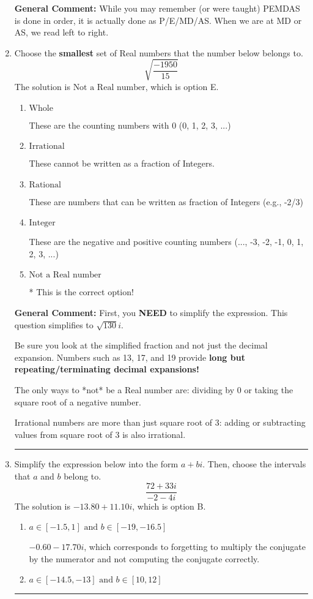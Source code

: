 \documentclass{extbook}[14pt]
\newcommand{\litem}[1]{\item #1

\rule{\textwidth}{0.4pt}}
\begin{document}
\begin{enumerate}
{\textbf{General Comment:} While you may remember (or were taught) PEMDAS is done in order, it is actually done as P/E/MD/AS. When we are at MD or AS, we read left to right.
}
\litem{
Choose the \textbf{smallest} set of Real numbers that the number below belongs to.
\[ \sqrt{\frac{-1950}{15}} \]The solution is \( \text{Not a Real number} \), which is option E.\begin{enumerate}[label=\Alph*.]
\item \( \text{Whole} \)

These are the counting numbers with 0 (0, 1, 2, 3, ...)
\item \( \text{Irrational} \)

These cannot be written as a fraction of Integers.
\item \( \text{Rational} \)

These are numbers that can be written as fraction of Integers (e.g., -2/3)
\item \( \text{Integer} \)

These are the negative and positive counting numbers (..., -3, -2, -1, 0, 1, 2, 3, ...)
\item \( \text{Not a Real number} \)

* This is the correct option!
\end{enumerate}

\textbf{General Comment:} First, you \textbf{NEED} to simplify the expression. This question simplifies to $\sqrt{130} i$. 
 
 Be sure you look at the simplified fraction and not just the decimal expansion. Numbers such as 13, 17, and 19 provide \textbf{long but repeating/terminating decimal expansions!} 
 
 The only ways to *not* be a Real number are: dividing by 0 or taking the square root of a negative number. 
 
 Irrational numbers are more than just square root of 3: adding or subtracting values from square root of 3 is also irrational.
}
\litem{
Simplify the expression below into the form $a+bi$. Then, choose the intervals that $a$ and $b$ belong to.
\[ \frac{72 + 33 i}{-2 - 4 i} \]The solution is \( -13.80  + 11.10 i \), which is option B.\begin{enumerate}[label=\Alph*.]
\item \( a \in [-1.5, 1] \text{ and } b \in [-19, -16.5] \)

 $-0.60  - 17.70 i$, which corresponds to forgetting to multiply the conjugate by the numerator and not computing the conjugate correctly.
\item \( a \in [-14.5, -13] \text{ and } b \in [10, 12] \)


\end{enumerate}}
\end{enumerate}
\end{document}
